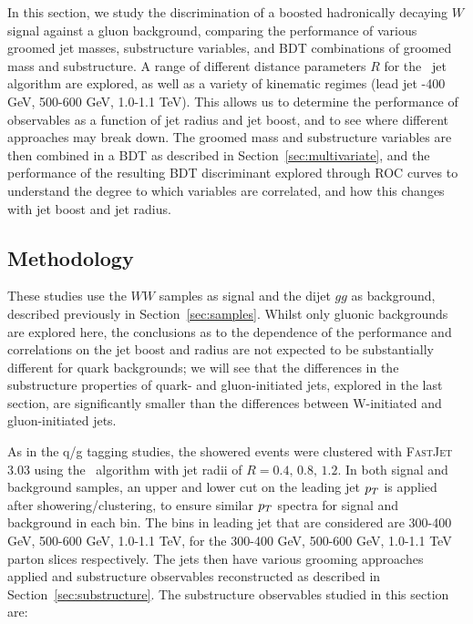 In this section, we study the discrimination of a boosted hadronically decaying $W$ signal against a gluon
background, comparing the performance of various groomed jet
masses, substructure variables, and BDT combinations of groomed mass
and substructure. 
A
range of different distance parameters $R$ for the \antikt~jet
algorithm are explored, as well as a variety of kinematic regimes
(lead jet -400 GeV, 500-600 GeV, 1.0-1.1 TeV). This allows us to determine the
performance of observables as a function of jet radius and jet boost, and to see
where different approaches may break down. The groomed
mass and substructure variables are then combined in a BDT as described in Section~\ref{sec:multivariate}, and the performance of the resulting BDT discriminant
explored through ROC curves to understand the degree to which
variables are correlated, and how
this changes with jet boost and jet radius. 

\subsection{Methodology}

These studies use the $WW$ samples as signal and the dijet $gg$ as background, described previously in Section~\ref{sec:samples}. Whilst only gluonic backgrounds
are explored here, the conclusions as to the dependence of the
performance and correlations on the jet boost and radius are not
expected to be substantially different for quark backgrounds; we will
see that the differences in the substructure properties of quark- and
gluon-initiated jets, explored in the last section, are significantly
smaller than the differences between W-initiated and gluon-initiated jets.

As in the q/g tagging studies, the showered events were clustered with \textsc{FastJet}
3.03 using
the \antikt~algorithm with jet radii of $R = 0.4,\, 0.8,\, 1.2$. In
both signal and background samples, an upper and lower cut on
the leading jet $p_T$ is applied after showering/clustering, to ensure
similar $p_T$ spectra for signal and background in each \pt bin. The bins
in leading jet \pt that are considered are 300-400 GeV, 500-600 GeV,
1.0-1.1 TeV, for the 300-400 GeV, 500-600 GeV,
1.0-1.1 TeV parton \pt slices respectively. The jets then have various
grooming approaches applied and substructure observables
reconstructed as described in
Section~\ref{sec:substructure}. The substructure observables
studied in this section are: 

